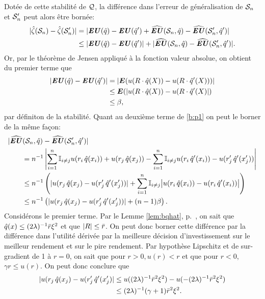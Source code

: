 Dotée de cette stabilité de $\alg$, la différence dans l'erreur de
généralisation de $\S_n$ et $\S_n'$ peut alors être bornée:
\begin{align}
  |\hat\zeta(\S_n) - \hat\zeta(\S_n')| &= |\EU(\hat q) - \EU(\hat q') + \hEU(\S_n,\hat q) - \hEU(\S_n',\hat q')|\\
                               &\leq |\EU(\hat q) - \EU(\hat q')| + |\hEU(\S_n,\hat q) -
                                 \hEU(\S_n',\hat q')|. \label{b:p1}                         
\end{align}
Or, par le théorème de Jensen appliqué à la fonction valeur absolue, on obtient du premier
terme que
\begin{align}
  |\EU(\hat q) - \EU(\hat q')| &= |\E(u(R \cdot \hat q(X)) - u(R \cdot \hat q'(X)))|\\
                               & \leq \E(|u(R\cdot \hat q(X)) - u(R \cdot \hat q'(X)|)\\
                               & \leq \beta,
\end{align}
par définiton de la stabilité. Quant au deuxième terme de \eqref{b:p1} on peut le borner
de la même façon:
\begin{align}
  &|\hEU(\S_n,\hat q) - \hEU(\S_n',\hat q')|\\
  &\qquad = n^{-1}\left|\sumi \mathbb{I}_{i\neq j}u(r_i\,\hat q(x_i)) + u(r_j\,\hat q(x_j)) - \sumi
    \mathbb{I}_{i\neq j}u(r_i\,\hat q'(x_i)) - u(r_j'\,\hat q'(x_j'))\right|\\
  &\qquad \leq n^{-1}\left(| u(r_j\,\hat q(x_j) - u(r_j'\,\hat q'(x_j'))| +\sumi \mathbb{I}_{i\neq
    j}\big|u(r_i\,\hat q(x_i)) - u(r_i\,\hat q'(x_i))\big|\right)\\
  &\qquad \leq n^{-1}\left(| u(r_j\,\hat q(x_j) - u(r_j'\,\hat q'(x_j'))| + (n-1)\beta\right).
\end{align}
Considérons le premier terme. Par le Lemme \ref{lem:bqhat}, p.~\pageref{lem:bqhat}, on
sait que $\hat q(x) \leq (2\lambda)^{-1}\rmax\xi^2$ et que $|R|\leq\rmax$. On peut donc borner cette
différence par la différence dans l'utilité dérivée par la meilleure décision
d'investissement sur le meilleur rendement et sur le pire rendement. Par hypothèse
Lipschitz et de sur-gradient de 1 à $r=0$, on sait que pour $r>0, u(r)<r$ et que pour
$r<0$, $\gamma r \leq u(r)$. On peut donc conclure que
\begin{align}
  |u(r_j\,\hat q(x_j) - u(r_j'\,\hat q'(x_j')| &\leq u((2\lambda)^{-1}\rmax^2\xi^2) -
                                                 u(-(2\lambda)^{-1}\rmax^2\xi^2)\\
  & \leq (2\lambda)^{-1}(\gamma+1)\rmax^2\xi^2.
\end{align}
